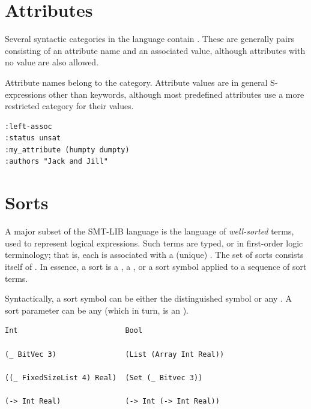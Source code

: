 \section{Attributes}

Several syntactic categories in the language contain .
These are generally pairs consisting of an attribute name and an associated value,
although attributes with no value are also allowed.

Attribute names belong to the  category. 
Attribute values are in general S-expressions other than keywords,
although most predefined attributes use a more restricted category for 
their values.
\bigskip

\cAttributes
\bigskip

\begin{lstlisting}[linewidth=21em]
:left-assoc      
:status unsat
:my_attribute (humpty dumpty)
:authors "Jack and Jill"
\end{lstlisting}



\section{Sorts} \label{sec:concrete-sorts}

A major subset of the SMT-LIB language is 
the language of \emph{well-sorted} terms,
used to represent logical expressions.
Such terms are typed, or  in first-order logic terminology; 
that is, each is associated with a (unique) .
The set of sorts consists itself of .
In essence, a sort is 
a ,
a , 
or a sort symbol applied to a sequence of sort terms.

Syntactically, a sort symbol can be either the distinguished symbol 
or any . 
A sort parameter can be any  
(which in turn, is an ).
\bigskip

\cSorts
\medskip

\begin{lstlisting}[linewidth=35em]
Int                         Bool

(_ BitVec 3)                (List (Array Int Real))

((_ FixedSizeList 4) Real)  (Set (_ Bitvec 3))       

(-> Int Real)               (-> Int (-> Int Real))
\end{lstlisting}


